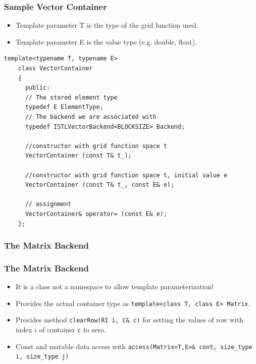 {\begin{frame}[fragile]
  \frametitle{Sample Vector Container}
  \begin{itemize}
  \item Template parameter T is the type of the grid function used.
  \item Template parameter E is the value type (e.g. double, float).
  \end{itemize}
  \begin{lstlisting}[basicstyle=\scriptsize]
    template<typename T, typename E>
    class VectorContainer 
    {
      public:
      // The stored element type
      typedef E ElementType;
      // The backend we are associated with
      typedef ISTLVectorBackend<BLOCKSIZE> Backend;
      
      //constructor with grid function space t
      VectorContainer (const T& t_);

      //constructor with grid function space t, initial value e
      VectorContainer (const T& t_, const E& e);
      
      // assignment
      VectorContainer& operator= (const E& e);
    };
  \end{lstlisting}
\end{frame}
\subsubsection{The Matrix Backend}
\label{sec:vector-backend}

\begin{frame}
  \frametitle<presentation>{The Matrix Backend}
  \begin{itemize}
  \item It is a class not a namespace to allow template
    parameterization!
  \item Provides the actual container type as
    \lstinline!template<class T, class E> Matrix!.
  \item Provides method \lstinline!clearRow(RI i, C& c)! for setting
    the values of row with index $i$ of container \lstinline!c! to
    zero.
    \item Const and mutable data access with 
    \lstinline!access(Matrix<T,E>& cont, size_type i, size_type j)!
  \end{itemize}
\end{frame}

}

